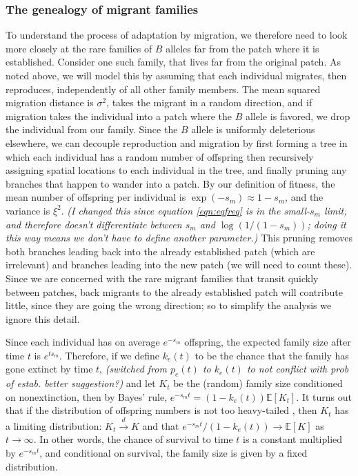 \documentclass{article}
\newcommand{\E}{\mathbb{E}}
\newcommand{\dconv}{\xrightarrow{d}}
\newcommand{\plr}[1]{{\it\color{blue}(#1)}}
\begin{document}
\subsubsection{The genealogy of migrant families}

To understand the process of adaptation by migration,
we therefore need to look more closely at the rare families of $B$ alleles far from the patch where it is established.
Consider one such family,
that lives far from the original patch.
As noted above, we will model this by assuming that each individual
migrates, then reproduces, independently of all other family members.
The mean squared migration distance is $\sigma^2$, takes the migrant in a random direction,
and if migration takes the individual into a patch where the $B$ allele is favored, 
we drop the individual from our family.
Since the $B$ allele is uniformly deleterious elsewhere,
we can decouple reproduction and migration
by first forming a tree in which each individual has a random number of offspring
then recursively assigning spatial locations to each individual in the tree,
and finally pruning any branches that happen to wander into a patch.
By our definition of fitness, the mean number of offspring per individual is $\exp(-s_m)\approx 1-s_m$,
and the variance is $\xi^2$.
\plr{I changed this since equation \eqref{eqn:eqfreq} is in the small-$s_m$ limit, 
and therefore doesn't differentiate between $s_m$ and $\log(1/(1-s_m))$;
doing it this way means we don't have to define another parameter.}
This pruning removes both branches leading back into the already established patch (which are irrelevant)
and branches leading into the new patch (we will need to count these).
Since we are concerned with the rare migrant families that transit quickly between patches, 
back migrants to the already established patch will contribute little, since they are going the wrong direction;
so to simplify the analysis we ignore this detail.  %

Since each individual has on average $e^{-s_m}$ offspring,
the expected family size after time $t$ is $e^{t s_m}$.
Therefore, if we define $k_e(t)$ to be the chance that the family
has gone extinct by time $t$, 
\plr{switched from $p_e(t)$ to $k_e(t)$ to not conflict with prob of estab.  better suggestion?}
and let $K_t$ be the (random) family size conditioned on nonextinction,
then by Bayes' rule, $e^{-s_m t} = (1-k_e(t))\E[K_t]$.
It turns out that if the distribution of offspring numbers is not too heavy-tailed \citep[see][for details]{jagers1975branching},
then $K_t$ has a limiting distribution: $K_t \dconv K$ 
and that $e^{-s_m t}/(1-k_e(t)) \to \E[K]$ as $t \to \infty$.
In other words, the chance of survival to time $t$ is a constant multiplied by $e^{-s_m t}$,
and conditional on survival, the family size is given by a fixed distribution.
\end{document}
